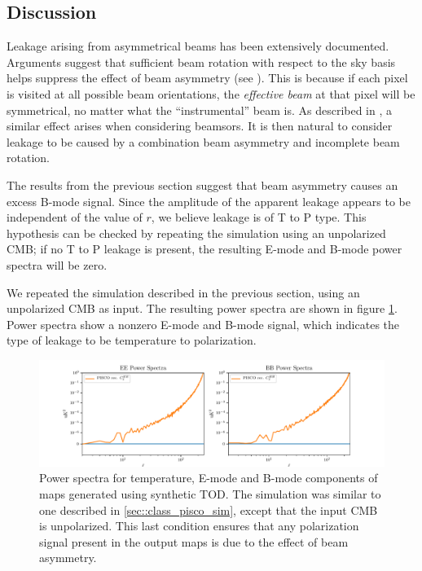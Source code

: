 \documentclass[a4paper,11pt]{article}
\begin{document}
\subsection{Discussion}

Leakage arising from asymmetrical beams has been extensively documented. Arguments suggest that sufficient beam rotation with respect to the sky basis helps suppress the effect of beam asymmetry (see \cite{2003ApJS..148...39P}). This is because if each pixel is visited at all possible beam orientations, the \textsl{effective beam} at that pixel will be symmetrical, no matter what the ``instrumental'' beam is. As described in \cite{2007MNRAS.376.1767O}, a similar effect arises when considering beamsors. It is then natural to consider leakage to be caused by a combination beam asymmetry and incomplete beam rotation.

The results from the previous section suggest that beam asymmetry causes an excess B-mode signal. Since the amplitude of the apparent leakage appears to be independent of the value of $r$, we believe leakage is of T to P type. This hypothesis can be checked by repeating the simulation using an unpolarized CMB; if no T to P leakage is present, the resulting E-mode and B-mode power spectra will be zero.

We repeated the simulation described in the previous section, using an unpolarized CMB as input. The resulting power spectra are shown in figure  \ref{fig::classscan720circulargaussianbeamsr0d00extratonly}. Power spectra show a nonzero E-mode and B-mode signal, which indicates the type of leakage to be temperature to polarization.

\begin{figure}
	\centering
	\includegraphics[width=1.0\linewidth]{figures/T_to_P_leakage_for_class.pdf}
	\caption{Power spectra for temperature, E-mode and B-mode components of maps generated using synthetic TOD. The simulation was similar to one described in \ref{sec::class_pisco_sim}, except that the input CMB is unpolarized. This last condition ensures that any polarization signal present in the output maps is due to the effect of beam asymmetry.}
	\label{fig::classscan720circulargaussianbeamsr0d00extratonly}
\end{figure}
\end{document}
